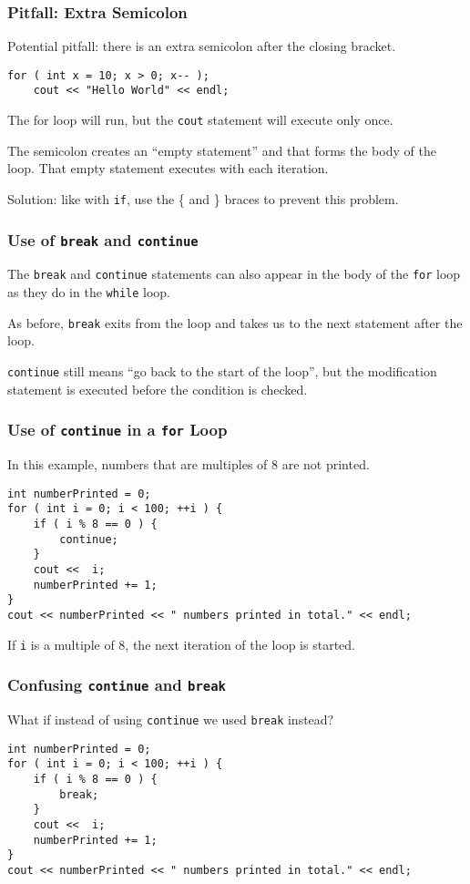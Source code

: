 \begin{frame}[fragile]
\frametitle{Pitfall: Extra Semicolon}

Potential pitfall: there is an extra semicolon after the closing bracket.

\begin{verbatim}
for ( int x = 10; x > 0; x-- );
    cout << "Hello World" << endl;
\end{verbatim}

The for loop will run, but the \texttt{cout} statement will execute only once.

The semicolon creates an ``empty statement'' and that forms the body of the loop. That empty statement executes with each iteration.

Solution: like with \texttt{if}, use the \{ and \} braces to prevent this problem.

\end{frame}

\begin{frame}
\frametitle{Use of \texttt{break} and \texttt{continue}}

The \texttt{break} and \texttt{continue} statements can also appear in the body of the \texttt{for} loop as they do in the \texttt{while} loop.

As before, \texttt{break} exits from the loop and takes us to the next statement after the loop.

\texttt{continue} still means ``go back to the start of the loop'', but the modification statement is executed before the condition is checked.

\end{frame}

\begin{frame}[fragile]
\frametitle{Use of \texttt{continue} in a \texttt{for} Loop}
In this example, numbers that are multiples of 8 are not printed.
{\scriptsize
\begin{verbatim}
int numberPrinted = 0;
for ( int i = 0; i < 100; ++i ) {
    if ( i % 8 == 0 ) {
        continue;
    }
    cout <<  i;
    numberPrinted += 1;
}
cout << numberPrinted << " numbers printed in total." << endl;
\end{verbatim}
}

If \texttt{i} is a multiple of 8, the next iteration of the loop is started.

\end{frame}

\begin{frame}[fragile]
\frametitle{Confusing \texttt{continue} and \texttt{break}}
What if instead of using \texttt{continue} we used \texttt{break} instead?
{\scriptsize
\begin{verbatim}
int numberPrinted = 0;
for ( int i = 0; i < 100; ++i ) {
    if ( i % 8 == 0 ) {
        break;
    }
    cout <<  i;
    numberPrinted += 1;
}
cout << numberPrinted << " numbers printed in total." << endl;
\end{verbatim}
}




\end{frame}

